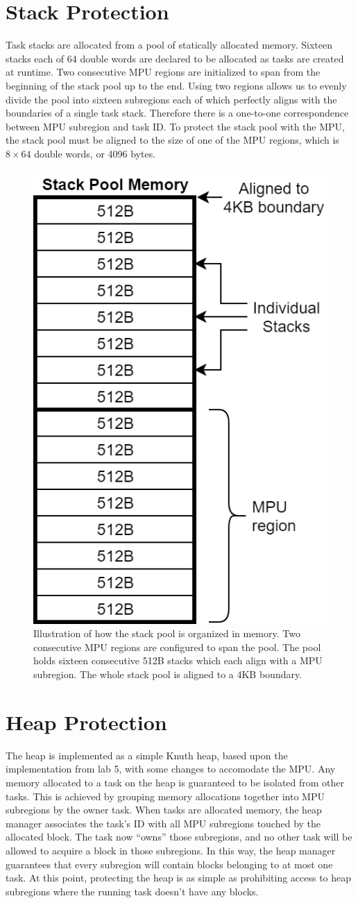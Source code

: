 \section{Stack Protection}

Task stacks are allocated from a pool of statically allocated memory. Sixteen stacks each of 64 double words are declared to be allocated as tasks are created at runtime. Two consecutive MPU regions are initialized to span from the beginning of the stack pool up to the end. Using two regions allows us to evenly divide the pool into sixteen subregions each of which perfectly aligns with the boundaries of a single task stack. Therefore there is a one-to-one correspondence between MPU subregion and task ID. To protect the stack pool with the MPU, the stack pool must be aligned to the size of one of the MPU regions, which is $8\times64$ double words, or 4096 bytes.

\begin{figure}[hbtp]
	\centering
	\includegraphics[width=0.4\columnwidth]{figs/stack_prot.png}
	\caption{Illustration of how the stack pool is organized in memory. Two consecutive MPU regions are configured to span the pool. The pool holds sixteen consecutive 512B stacks which each align with a MPU subregion. The whole stack pool is aligned to a 4KB boundary.}
	\label{fig:stack_prot}
\end{figure}

\section{Heap Protection}

The heap is implemented as a simple Knuth heap, based upon the implementation from lab 5, with some changes to accomodate the MPU. Any memory allocated to a task on the heap is guaranteed to be isolated from other tasks. This is achieved by grouping memory allocations together into MPU subregions by the owner task. When tasks are allocated memory, the heap manager associates the task's ID with all MPU subregions touched by the allocated block. The task now ``owns'' those subregions, and no other task will be allowed to acquire a block in those subregions. In this way, the heap manager guarantees that every subregion will contain blocks belonging to at most one task. At this point, protecting the heap is as simple as prohibiting access to heap subregions where the running task doesn't have any blocks.

